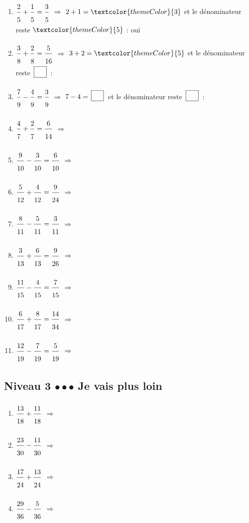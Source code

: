 \begin{enumerate}[leftmargin=*,align=parleft, label=\alph*), itemsep=9pt]
\item $\FA{2}{5}+\FA{1}{5}=\FA{3}{5}$ \quad $\Longrightarrow$ \quad $2 + 1 = \textcolor{themeColor}{3}$ \quad et \quad le dénominateur reste $\textcolor{themeColor}{5}$ \quad : \quad \textcolor{themeColor}{oui}
\item $\FA{3}{8}+\FA{2}{8}=\FA{5}{16}$ \quad $\Longrightarrow$ \quad $3 + 2 = \textcolor{themeColor}{5}$ \quad et \quad le dénominateur reste $\CaseC$ \quad : \quad \Case
\item $\FA{7}{9}-\FA{4}{9}=\FA{3}{9}$ \quad $\Longrightarrow$ \quad $7 - 4 = \CaseC$ \quad et \quad le dénominateur reste $\CaseC$ \quad : \quad \Case
\item $\FA{4}{7}+\FA{2}{7}=\FA{6}{14}$ \quad $\Longrightarrow$
\item $\FA{9}{10}-\FA{3}{10}=\FA{6}{10}$ \quad $\Longrightarrow$
\item $\FA{5}{12}+\FA{4}{12}=\FA{9}{24}$ \quad $\Longrightarrow$
\item $\FA{8}{11}-\FA{5}{11}=\FA{3}{11}$ \quad $\Longrightarrow$
\item $\FA{3}{13}+\FA{6}{13}=\FA{9}{26}$ \quad $\Longrightarrow$
\item $\FA{11}{15}-\FA{4}{15}=\FA{7}{15}$ \quad $\Longrightarrow$
\item $\FA{6}{17}+\FA{8}{17}=\FA{14}{34}$ \quad $\Longrightarrow$
\item $\FA{12}{19}-\FA{7}{19}=\FA{5}{19}$ \quad $\Longrightarrow$
\end{enumerate}
 
\newpage
\subsection{Niveau 3 \quad $\bullet\bullet\bullet$ \quad Je vais plus loin}
 
 
\begin{enumerate}[leftmargin=*,align=parleft, label=\alph*), itemsep=9pt]
\item $\FA{13}{18}+\FA{11}{18}$ \quad $\Longrightarrow$
\item $\FA{23}{30}-\FA{11}{30}$ \quad $\Longrightarrow$
\item $\FA{17}{24}+\FA{13}{24}$ \quad $\Longrightarrow$
\item $\FA{29}{36}-\FA{5}{36}$ \quad $\Longrightarrow$
\end{enumerate}
 
